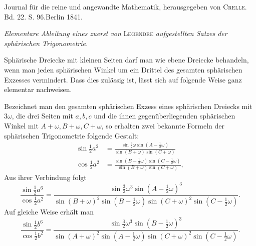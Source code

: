 \clearpage
{}
\begin{center}Journal für die reine und angewandte Mathematik, herausgegeben von \textsc{Crelle}.\\
Bd. 22. S. 96.\quad Berlin 1841.\end{center}
\begin{center}\textit{Elementare Ableitung eines zuerst von} \textsc{Legendre} \textit{aufgestellten Satzes der sphärischen Trigonometrie.}\end{center}
\noindent\hspace*{1.2em}Sphärische Dreiecke mit kleinen Seiten darf man wie ebene Dreiecke behandeln, wenn man jeden sphärischen Winkel um ein Drittel des gesamten sphärischen Exzesses vermindert. Dass dies zulässig ist, lässt sich auf folgende Weise ganz elementar nachweisen.

Bezeichnet man den gesamten sphärischen Exzess eines sphärischen Dreiecks mit $3\omega$, die drei Seiten mit $a,b,c$ und die ihnen gegenüberliegenden sphärischen Winkel mit $A+\omega,B+\omega,C+\omega$, so erhalten zwei bekannte Formeln der sphärischen Trigonometrie folgende Gestalt:
\[
\begin{aligned}
\sin\tfrac12 a^2&=\frac{\sin\tfrac32\omega\sin(A-\tfrac12\omega)}{\sin(B+\omega)\sin(C+\omega)}\\[5pt]
\cos\tfrac12 a^2&=\frac{\sin(B-\tfrac12\omega)\sin(C-\tfrac12\omega)}{\sin(B+\omega)\sin(C+\omega)},
\end{aligned}
\]
\noindent Aus ihrer Verbindung folgt
\[
\frac{\sin\tfrac12 a^6}{\cos\tfrac12 a^2}
=\frac{\sin\tfrac32\omega^3\sin(A-\tfrac12\omega)^3}
{\sin(B+\omega)^2\sin(B-\tfrac12\omega)\sin(C+\omega)^2\sin(C-\tfrac12\omega)}.
\]
\noindent Auf gleiche Weise erhält man
\[
\frac{\sin\tfrac12 b^6}{\cos\tfrac12 b^2}
=\frac{\sin\tfrac32\omega^3\sin(B-\tfrac12\omega)^3}
{\sin(A+\omega)^2\sin(A-\tfrac12\omega)\sin(C+\omega)^2\sin(C-\tfrac12\omega)}.
\]

